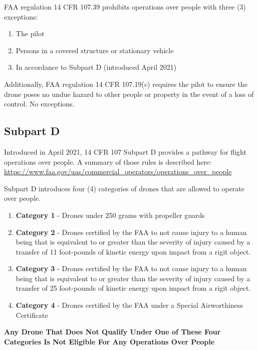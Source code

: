 \documentclass[
  12pt,
]{book}
\providecommand{\tightlist}{%
  \setlength{\itemsep}{0pt}\setlength{\parskip}{0pt}}
\begin{document}
FAA regulation 14 CFR 107.39 prohibits operations over people with three (3) exceptions:

\begin{enumerate}
\def\labelenumi{\arabic{enumi}.}
\tightlist
\item
  The pilot
\item
  Persons in a covered structure or stationary vehicle
\item
  In accordance to Subpart D (introduced April 2021)
\end{enumerate}

Additionally, FAA regulation 14 CFR 107.19(c) requires the pilot to ensure the drone poses no undue hazard to other people or property in the event of a loss of control. No exceptions.

\hypertarget{subpart-d}{%
\subsection{Subpart D}\label{subpart-d}}

Introduced in April 2021, 14 CFR 107 Subpart D provides a pathway for flight operations over people. A summary of those rules is described here: \url{https://www.faa.gov/uas/commercial_operators/operations_over_people}

Subpart D introduces four (4) categories of drones that are allowed to operate over people.

\begin{enumerate}
\def\labelenumi{\arabic{enumi}.}
\tightlist
\item
  \textbf{Category 1} - Drones under 250 grams with propeller guards
\item
  \textbf{Category 2} - Drones certified by the FAA to not cause injury to a human being that is equivalent to or greater than the severity of injury caused by a transfer of 11 foot-pounds of kinetic energy upon impact from a rigit object.
\item
  \textbf{Category 3} - Drones certified by the FAA to not cause injury to a human being that is equivalent to or greater than the severity of injury caused by a transfer of 25 foot-pounds of kinetic energy upon impact from a rigit object.
\item
  \textbf{Category 4} - Drones certified by the FAA under a Special Airworthiness Certificate
\end{enumerate}

\textbf{Any Drone That Does Not Qualify Under One of These Four Categories Is Not Eligible For Any Operations Over People}
\end{document}
